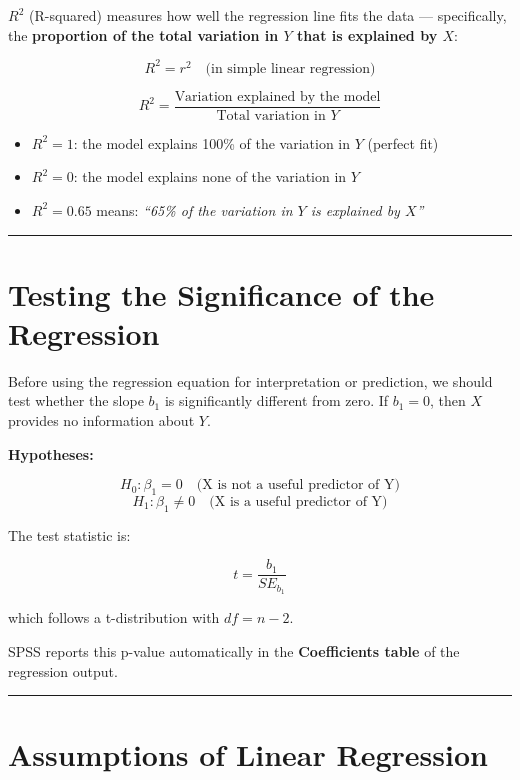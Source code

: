 \documentclass[
  12pt,
  letterpaper,
]{book}
\newcounter{none} %
\providecommand{\tightlist}{%
  \setlength{\itemsep}{0pt}\setlength{\parskip}{0pt}}
\begin{document}
\textbf{\(R^2\)} (R-squared) measures how well the regression line fits
the data --- specifically, the \textbf{proportion of the total variation
in \(Y\) that is explained by \(X\)}:

\[R^2 = r^2 \quad \text{(in simple linear regression)}\]

\[R^2 = \frac{\text{Variation explained by the model}}{\text{Total variation in } Y}\]

\begin{itemize}
\tightlist
\item
  \(R^2 = 1\): the model explains 100\% of the variation in \(Y\)
  (perfect fit)
\item
  \(R^2 = 0\): the model explains none of the variation in \(Y\)
\item
  \(R^2 = 0.65\) means: \emph{``65\% of the variation in \(Y\) is
  explained by \(X\)''}
\end{itemize}

\begin{center}\rule{0.5\linewidth}{0.5pt}\end{center}

\section{Testing the Significance of the
Regression}\label{testing-the-significance-of-the-regression}

Before using the regression equation for interpretation or prediction,
we should test whether the slope \(b_1\) is significantly different from
zero. If \(b_1 = 0\), then \(X\) provides no information about \(Y\).

\textbf{Hypotheses:}

\[H_0: \beta_1 = 0 \quad \text{(X is not a useful predictor of Y)}\]
\[H_1: \beta_1 \neq 0 \quad \text{(X is a useful predictor of Y)}\]

The test statistic is:

\[t = \frac{b_1}{SE_{b_1}}\]

which follows a t-distribution with \(df = n - 2\).

SPSS reports this p-value automatically in the \textbf{Coefficients
table} of the regression output.

\begin{center}\rule{0.5\linewidth}{0.5pt}\end{center}

\section{Assumptions of Linear
Regression}\label{assumptions-of-linear-regression}
\end{document}

